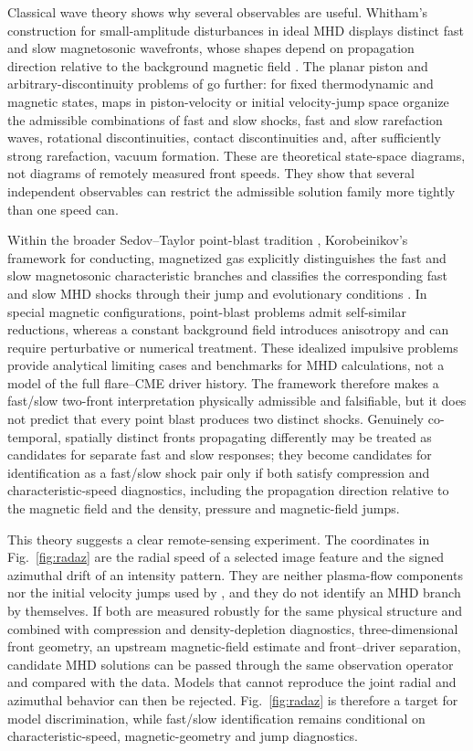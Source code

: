 \documentclass[11pt]{article}
\let\parencite\citep
\let\textcite\citet
\begin{document}
Classical wave theory shows why several observables are useful. Whitham's construction for small-amplitude disturbances in ideal MHD displays distinct fast and slow magnetosonic wavefronts, whose shapes depend on propagation direction relative to the background magnetic field \parencite{Whitham1974}. The planar piston and arbitrary-discontinuity problems of \textcite{KulikovskiyLyubimov1965} go further: for fixed thermodynamic and magnetic states, maps in piston-velocity or initial velocity-jump space organize the admissible combinations of fast and slow shocks, fast and slow rarefaction waves, rotational discontinuities, contact discontinuities and, after sufficiently strong rarefaction, vacuum formation. These are theoretical state-space diagrams, not diagrams of remotely measured front speeds. They show that several independent observables can restrict the admissible solution family more tightly than one speed can.

Within the broader Sedov--Taylor point-blast tradition \parencite{Sedov1959}, Korobeinikov's framework for conducting, magnetized gas explicitly distinguishes the fast and slow magnetosonic characteristic branches and classifies the corresponding fast and slow MHD shocks through their jump and evolutionary conditions \parencite{KorobeinikovKarlikov1960,Korobeinikov1973,Korobeinikov1991}. In special magnetic configurations, point-blast problems admit self-similar reductions, whereas a constant background field introduces anisotropy and can require perturbative or numerical treatment. These idealized impulsive problems provide analytical limiting cases and benchmarks for MHD calculations, not a model of the full flare--CME driver history. The framework therefore makes a fast/slow two-front interpretation physically admissible and falsifiable, but it does not predict that every point blast produces two distinct shocks. Genuinely co-temporal, spatially distinct fronts propagating differently may be treated as candidates for separate fast and slow responses; they become candidates for identification as a fast/slow shock pair only if both satisfy compression and characteristic-speed diagnostics, including the propagation direction relative to the magnetic field and the density, pressure and magnetic-field jumps.

This theory suggests a clear remote-sensing experiment. The coordinates in Fig.~\ref{fig:radaz} are the radial speed of a selected image feature and the signed azimuthal drift of an intensity pattern. They are neither plasma-flow components nor the initial velocity jumps used by \textcite{KulikovskiyLyubimov1965}, and they do not identify an MHD branch by themselves. If both are measured robustly for the same physical structure and combined with compression and density-depletion diagnostics, three-dimensional front geometry, an upstream magnetic-field estimate and front--driver separation, candidate MHD solutions can be passed through the same observation operator and compared with the data. Models that cannot reproduce the joint radial and azimuthal behavior can then be rejected. Fig.~\ref{fig:radaz} is therefore a target for model discrimination, while fast/slow identification remains conditional on characteristic-speed, magnetic-geometry and jump diagnostics.
\end{document}
